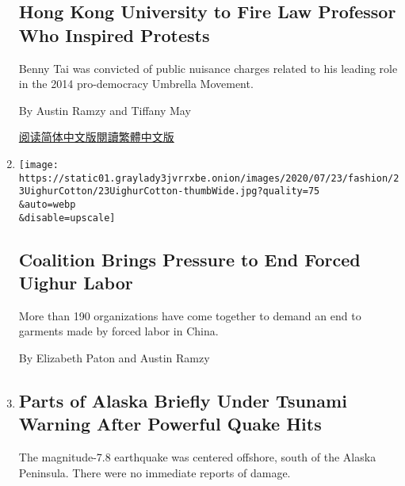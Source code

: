 \begin{enumerate}
  \hypertarget{hong-kong-university-to-fire-law-professor-who-inspired-protests}{%
  \subsection{Hong Kong University to Fire Law Professor Who Inspired
  Protests}\label{hong-kong-university-to-fire-law-professor-who-inspired-protests}}

  Benny Tai was convicted of public nuisance charges related to his
  leading role in the 2014 pro-democracy Umbrella Movement.

  By Austin Ramzy and Tiffany May

  \href{https://cn.nytimes3xbfgragh.onion/china/20200729/benny-tai-hong-kong-university/}{阅读简体中文版}\href{https://cn.nytimes3xbfgragh.onion/china/20200729/benny-tai-hong-kong-university/zh-hant}{閱讀繁體中文版}
\item
  \href{/2020/07/23/fashion/uighur-forced-labor-cotton-fashion.html}{}

  \texttt{[image: https://static01.graylady3jvrrxbe.onion/images/2020/07/23/fashion/23UighurCotton/23UighurCotton-thumbWide.jpg?quality=75\\\&auto=webp\\\&disable=upscale]}

  \hypertarget{coalition-brings-pressure-to-end-forced-uighur-labor}{%
  \subsection{Coalition Brings Pressure to End Forced Uighur
  Labor}\label{coalition-brings-pressure-to-end-forced-uighur-labor}}

  More than 190 organizations have come together to demand an end to
  garments made by forced labor in China.

  By Elizabeth Paton and Austin Ramzy
\item
  \href{/2020/07/22/us/alaska-earthquake-tsunami-warning.html}{}

  \hypertarget{parts-of-alaska-briefly-under-tsunami-warning-after-powerful-quake-hits}{%
  \subsection{Parts of Alaska Briefly Under Tsunami Warning After
  Powerful Quake
  Hits}\label{parts-of-alaska-briefly-under-tsunami-warning-after-powerful-quake-hits}}

  The magnitude-7.8 earthquake was centered offshore, south of the
  Alaska Peninsula. There were no immediate reports of damage.


\end{enumerate}
